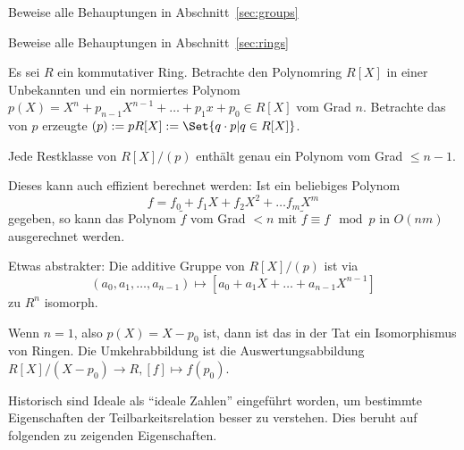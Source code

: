 \begin{sheet}

    \begin{problem}[title={Gruppen}]
        Beweise alle Behauptungen in Abschnitt~\ref{sec:groups}
    \end{problem}

    \begin{problem}[title={Ringe}]
        Beweise alle Behauptungen in Abschnitt~\ref{sec:rings}
    \end{problem}

    \begin{problem}[title={Quotienten von Polynomringen I}]
        Es sei $R$ ein kommutativer Ring. Betrachte den Polynomring $R[X]$ in einer Unbekannten und ein normiertes Polynom $p(X) = X^n + p_{n-1} X^{n-1} + \ldots + p_1 x+p_0 \in R[X]$ vom Grad $n$. Betrachte das von $p$ erzeugte  $(p):=pR[X]:=\Set{q\cdot p | q\in R[X]}$.


        \begin{subproblem}
            Jede Restklasse von $R[X]/(p)$ enthält genau ein Polynom vom Grad $\leq n-1$.

            Dieses kann auch effizient berechnet werden: Ist ein beliebiges Polynom
            \[f = f_0 + f_1 X + f_2 X ^2 + \ldots f_m X^m\]
            gegeben, so kann das Polynom $\tilde{f}$ vom Grad $<n$ mit $\tilde{f} \equiv f\mod p$ in $O(nm)$ ausgerechnet werden.
        \end{subproblem}

        \begin{subproblem}
            Etwas abstrakter: Die additive Gruppe von $R[X]/(p)$ ist via
            \[(a_0,a_1,\ldots,a_{n-1}) \mapsto [a_0+a_1 X+\ldots +a_{n-1}X^{n-1}]\]
            zu $R^n$ isomorph.
        \end{subproblem}

        \begin{subproblem}
            Wenn $n=1$, also $p(X) = X-p_0$ ist, dann ist das in der Tat ein Isomorphismus von Ringen. Die Umkehrabbildung ist die Auswertungsabbildung $R[X]/(X-p_0) \to R, [f] \mapsto f(p_0)$.
        \end{subproblem}
    \end{problem}

    \begin{problem}[title={Ideale vs. Teilbarkeit}]
        Historisch sind Ideale als \enquote{ideale Zahlen} eingeführt worden, um bestimmte Eigenschaften der Teilbarkeitsrelation besser zu verstehen. Dies beruht auf folgenden zu zeigenden Eigenschaften.


\end{problem}
\end{sheet}
